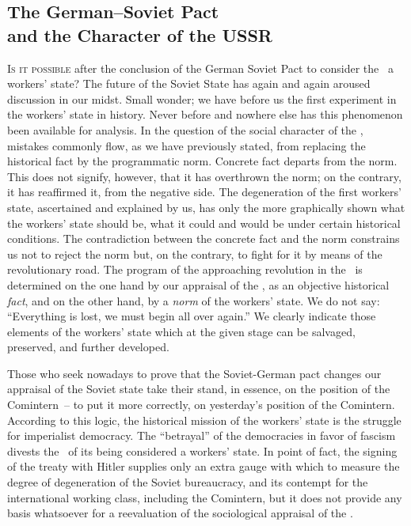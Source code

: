 
\subsection*{The German--Soviet Pact \\ and the Character of the USSR}

\lettrine{I}{s it possible} after the conclusion of the German Soviet Pact to consider the \USSR\ a workers’ state? The future of the Soviet State has again and again aroused discussion in our midst. Small wonder; we have before us the first experiment in the workers’ state in history. Never before and nowhere else has this phenomenon been available for analysis. In the question of the social character of the \USSR, mistakes commonly flow, as we have previously stated, from replacing the historical fact by the programmatic norm. Concrete fact departs from the norm. This does not signify, however, that it has overthrown the norm; on the contrary, it has reaffirmed it, from the negative side. The degeneration of the first workers’ state, ascertained and explained by us, has only the more graphically shown what the workers’ state should be, what it could and would be under certain historical conditions. The contradiction between the concrete fact and the norm constrains us not to reject the norm but, on the contrary, to fight for it by means of the revolutionary road. The program of the approaching revolution in the \USSR\ is determined on the one hand by our appraisal of the \USSR, as an objective historical \emph{fact}, and on the other hand, by a \emph{norm} of the workers’ state. We do not say: “Everything is lost, we must begin all over again.” We clearly indicate those elements of the workers’ state which at the given stage can be salvaged, preserved, and further developed.

Those who seek nowadays to prove that the Soviet-German pact changes our appraisal of the Soviet state take their stand, in essence, on the position of the Comintern~-- to put it more correctly, on yesterday’s position of the Comintern. According to this logic, the historical mission of the workers’ state is the struggle for imperialist democracy. The “betrayal” of the democracies in favor of fascism divests the \USSR\ of its being considered a workers’ state. In point of fact, the signing of the treaty with Hitler supplies only an extra gauge with which to measure the degree of degeneration of the Soviet bureaucracy, and its contempt for the international working class, including the Comintern, but it does not provide any basis whatsoever for a reevaluation of the sociological appraisal of the \USSR.


